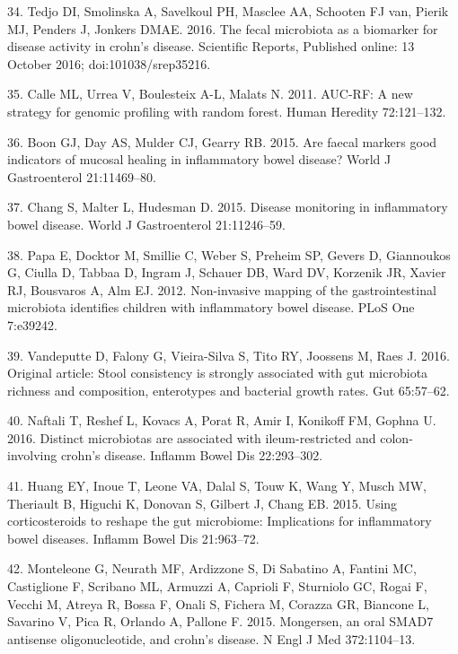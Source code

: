 \documentclass[11pt,]{article}
\begin{document}
\hypertarget{ref-tedjo_CDactivity_2016}{}
34. Tedjo DI, Smolinska A, Savelkoul PH, Masclee AA, Schooten FJ van,
Pierik MJ, Penders J, Jonkers DMAE. 2016. The fecal microbiota as a
biomarker for disease activity in crohn's disease. Scientific Reports,
Published online: 13 October 2016; doi:101038/srep35216.

\hypertarget{ref-calle_aucrf_2011}{}
35. Calle ML, Urrea V, Boulesteix A-L, Malats N. 2011. AUC-RF: A new
strategy for genomic profiling with random forest. Human Heredity
72:121--132.

\hypertarget{ref-boon_fmarkers_2015}{}
36. Boon GJ, Day AS, Mulder CJ, Gearry RB. 2015. Are faecal markers good
indicators of mucosal healing in inflammatory bowel disease? World J
Gastroenterol 21:11469--80.

\hypertarget{ref-chang_monitoring_2015}{}
37. Chang S, Malter L, Hudesman D. 2015. Disease monitoring in
inflammatory bowel disease. World J Gastroenterol 21:11246--59.

\hypertarget{ref-papa_pedsIBD_2012}{}
38. Papa E, Docktor M, Smillie C, Weber S, Preheim SP, Gevers D,
Giannoukos G, Ciulla D, Tabbaa D, Ingram J, Schauer DB, Ward DV,
Korzenik JR, Xavier RJ, Bousvaros A, Alm EJ. 2012. Non-invasive mapping
of the gastrointestinal microbiota identifies children with inflammatory
bowel disease. PLoS One 7:e39242.

\hypertarget{ref-vandeputte_stoolcon_2016}{}
39. Vandeputte D, Falony G, Vieira-Silva S, Tito RY, Joossens M, Raes J.
2016. Original article: Stool consistency is strongly associated with
gut microbiota richness and composition, enterotypes and bacterial
growth rates. Gut 65:57--62.

\hypertarget{ref-naftali_tissinvol_2016}{}
40. Naftali T, Reshef L, Kovacs A, Porat R, Amir I, Konikoff FM, Gophna
U. 2016. Distinct microbiotas are associated with ileum-restricted and
colon-involving crohn's disease. Inflamm Bowel Dis 22:293--302.

\hypertarget{ref-huang_cort_2015}{}
41. Huang EY, Inoue T, Leone VA, Dalal S, Touw K, Wang Y, Musch MW,
Theriault B, Higuchi K, Donovan S, Gilbert J, Chang EB. 2015. Using
corticosteroids to reshape the gut microbiome: Implications for
inflammatory bowel diseases. Inflamm Bowel Dis 21:963--72.

\hypertarget{ref-monteleone_mongersen_2015}{}
42. Monteleone G, Neurath MF, Ardizzone S, Di Sabatino A, Fantini MC,
Castiglione F, Scribano ML, Armuzzi A, Caprioli F, Sturniolo GC, Rogai
F, Vecchi M, Atreya R, Bossa F, Onali S, Fichera M, Corazza GR, Biancone
L, Savarino V, Pica R, Orlando A, Pallone F. 2015. Mongersen, an oral
SMAD7 antisense oligonucleotide, and crohn's disease. N Engl J Med
372:1104--13.
\end{document}
